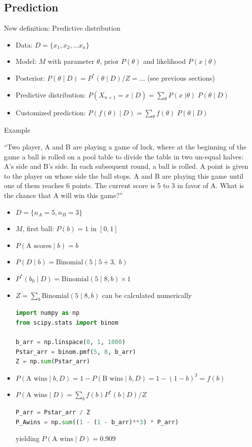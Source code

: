 \subsection{Prediction}
\no New definition: Predictive distribution
\begin{itemize}
	\item Data: $D = \{x_1, x_2, \ldots x_n\}$
	\item Model: $M$ with parameter $\theta$, prior $P(\theta)$ and likelihood $P(x\;|\;\theta)$
	\item Posterior: $P(\theta\;|\;D) = P^\ast(\theta\;|\;D) / Z = \ldots$ (see previous sections)
	\item Predictive distribution: $P(X_{n+1} = x\;|\;D) = \sum_\theta P(x\;|\theta)\; P(\theta\;|\;D)$
	\item Customized prediction: $P(f(\theta)\;|\;D) = \sum_\theta f(\theta)\; P(\theta\;|\;D)$
\end{itemize}
Example

``Two player, A and B are playing a game of luck, where at the beginning of the game a ball is rolled on a pool table to divide the table in two un-equal halves: A's side and B's side. In each subsequent round, a ball is rolled. A point is given to the player on whose side the ball stops. A and B are playing this game until one of them reaches 6 points. The current score is 5 to 3 in favor of A. What is the chance that A will win this game?''
\begin{itemize}
	\item $D = \{n_A = 5, n_B = 3\}$
	\item $M$, first ball: $P(b) = 1$ in $[0,1]$
	\item $P(\text{A scores}\;|\;b) = b$
	\item $P(D\;|\;b) = \text{Binomial}(5\;|\;5 + 3, \;b)$
	\item $P^\ast(b_0\;|\;D) = \text{Binomial}(5\;|\; 8, b) \times 1$
	\item $Z = \sum_{b} \text{Binomial}(5\;|\; 8, b)$ can be calculated numerically
\begin{lstlisting}[language=python]
import numpy as np
from scipy.stats import binom

b_arr = np.linspace(0, 1, 1000)
Pstar_arr = binom.pmf(5, 8, b_arr)
Z = np.sum(Pstar_arr)
\end{lstlisting}
	\item $P(\text{A wins}\;|\;b, D) = 1 - P(\text{B wins}\;|\;b, D) = 1 - (1 - b)^3 = f(b)$
	\item $P(\text{A wins}\;|\;D) = \sum_{b} f(b) P^\ast(b\;|\;D) / Z$
\begin{lstlisting}[language=python]
P_arr = Pstar_arr / Z
P_Awins = np.sum((1 - (1 - b_arr)**3) * P_arr)
\end{lstlisting}
	yielding $P(\text{A wins}\;|\;D) = 0.909$
\end{itemize}





